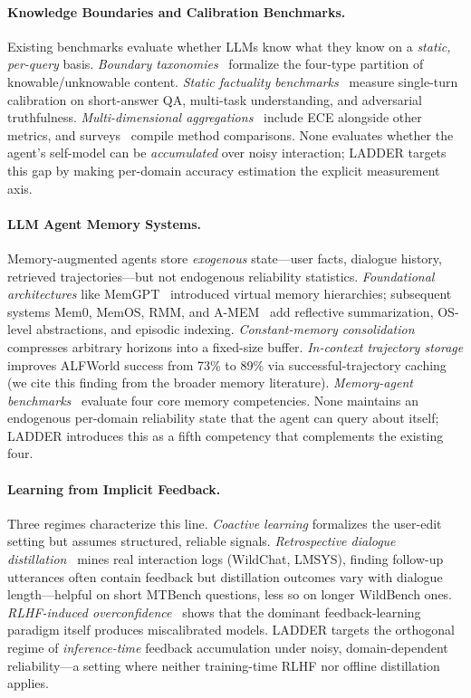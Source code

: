 \documentclass[11pt]{article}
\begin{document}
\paragraph{Knowledge Boundaries and Calibration Benchmarks.}
Existing benchmarks evaluate whether LLMs know what they know on a \emph{static, per-query} basis. \emph{Boundary taxonomies}~\citep{li2025knowledge_boundary, yin2024benchmarking_boundary} formalize the four-type partition of knowable/unknowable content. \emph{Static factuality benchmarks}~\citep{wei2024simpleqa, hendrycks2021measuring, lin2022truthfulqa} measure single-turn calibration on short-answer QA, multi-task understanding, and adversarial truthfulness. \emph{Multi-dimensional aggregations}~\citep{liang2022helm} include ECE alongside other metrics, and surveys~\citep{geng2024survey} compile method comparisons. None evaluates whether the agent's self-model can be \emph{accumulated} over noisy interaction; LADDER targets this gap by making per-domain accuracy estimation the explicit measurement axis.

\paragraph{LLM Agent Memory Systems.}
Memory-augmented agents store \emph{exogenous} state---user facts, dialogue history, retrieved trajectories---but not endogenous reliability statistics. \emph{Foundational architectures} like MemGPT~\citep{packer2023memgpt} introduced virtual memory hierarchies; subsequent systems Mem0, MemOS, RMM, and A-MEM~\citep{mem02025, li2025memos, tan2025rmm, xu2025amem} add reflective summarization, OS-level abstractions, and episodic indexing. \emph{Constant-memory consolidation}~\citep{mem1_2026} compresses arbitrary horizons into a fixed-size buffer. \emph{In-context trajectory storage} improves ALFWorld success from 73\% to 89\% via successful-trajectory caching (we cite this finding from the broader memory literature). \emph{Memory-agent benchmarks}~\citep{hu2026memoryagent} evaluate four core memory competencies. None maintains an endogenous per-domain reliability state that the agent can query about itself; LADDER introduces this as a fifth competency that complements the existing four.

\paragraph{Learning from Implicit Feedback.}
Three regimes characterize this line. \emph{Coactive learning} formalizes the user-edit setting but assumes structured, reliable signals. \emph{Retrospective dialogue distillation}~\citep{liu2025implicit} mines real interaction logs (WildChat, LMSYS), finding follow-up utterances often contain feedback but distillation outcomes vary with dialogue length---helpful on short MTBench questions, less so on longer WildBench ones. \emph{RLHF-induced overconfidence}~\citep{leng2025taming} shows that the dominant feedback-learning paradigm itself produces miscalibrated models. LADDER targets the orthogonal regime of \emph{inference-time} feedback accumulation under noisy, domain-dependent reliability---a setting where neither training-time RLHF nor offline distillation applies.
\end{document}
